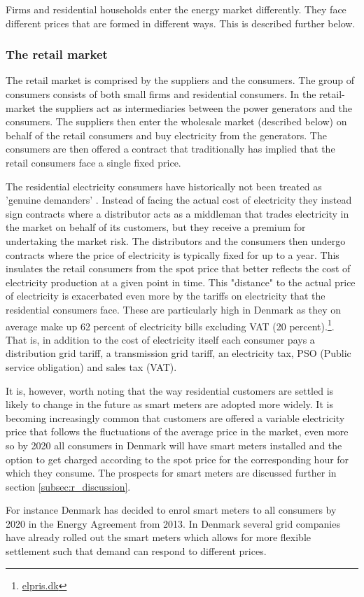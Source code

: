 Firms and residential households enter the energy market differently. They face different prices that are formed in different ways. This is described further below.

\subsubsection{The retail market}
\label{subsubsec: t_resmarket}
The retail market is comprised by the suppliers and the consumers. The group of consumers consists of both small firms and residential consumers. In the retail-market the suppliers act as intermediaries between the power generators and the consumers. The suppliers then enter the wholesale market (described below) on behalf of the retail consumers and buy electricity from the generators. The consumers are then offered a contract that traditionally has implied that the retail consumers face a single fixed price.
\bigskip \par
The residential electricity consumers have historically not been treated as 'genuine demanders' \citep{kirschen2003demand}. Instead of facing the actual cost of electricity they instead sign contracts where a distributor acts as a middleman that trades electricity in the market on behalf of its customers, but they receive a premium for undertaking the market risk. The distributors and the consumers then undergo contracts where the price of electricity is typically fixed for up to a year. This insulates the retail consumers from the spot price that better reflects the cost of electricity production at a given point in time. This "distance" to the actual price of electricity is exacerbated even more by the tariffs on electricity that the residential consumers face. These are particularly high in Denmark as they on average make up 62 percent of electricity bills excluding VAT (20 percent).\footnote{\href{https://elpris.dk}{elpris.dk}}. That is, in addition to the cost of electricity itself each consumer pays a distribution grid tariff, a transmission grid tariff, an electricity tax, PSO (Public service obligation) and sales tax (VAT).
\bigskip \par
It is, however, worth noting that the way residential customers are settled is likely to change in the future as smart meters are adopted more widely. It is becoming increasingly common that customers are offered a variable electricity price that follows the fluctuations of the average price in the market, even more so by 2020 all consumers in Denmark will have smart meters installed and the option to get charged according to the spot price for the corresponding hour for which they consume. The prospects for smart meters are discussed further in section \ref{subsec:r_discussion}.
\par
For instance Denmark has decided to enrol smart meters to all consumers by 2020 in the Energy Agreement from 2013. In Denmark several grid companies have already rolled out the smart meters which allows for more flexible settlement such that demand can respond to different prices. 

